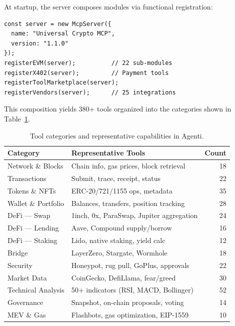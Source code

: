 \documentclass[11pt]{article}
\begin{document}
At startup, the server composes modules via functional registration:

\begin{lstlisting}[caption={Module composition at server initialization.},label={lst:compose}]
const server = new McpServer({
  name: "Universal Crypto MCP",
  version: "1.1.0"
});
registerEVM(server);          // 22 sub-modules
registerX402(server);         // Payment tools
registerToolMarketplace(server);
registerVendors(server);      // 25 integrations
\end{lstlisting}

This composition yields 380+ tools organized into the categories shown in Table~\ref{tab:tools}.

\begin{table}[t]
\centering
\caption{Tool categories and representative capabilities in Agenti.}
\label{tab:tools}
\begin{tabular}{@{}llr@{}}
\toprule
\textbf{Category} & \textbf{Representative Tools} & \textbf{Count} \\
\midrule
Network \& Blocks     & Chain info, gas prices, block retrieval       & 18 \\
Transactions          & Submit, trace, receipt, status                 & 22 \\
Tokens \& NFTs        & ERC-20/721/1155 ops, metadata                 & 35 \\
Wallet \& Portfolio   & Balances, transfers, position tracking         & 28 \\
DeFi --- Swap         & 1inch, 0x, ParaSwap, Jupiter aggregation      & 24 \\
DeFi --- Lending      & Aave, Compound supply/borrow                  & 16 \\
DeFi --- Staking      & Lido, native staking, yield calc              & 12 \\
Bridge                & LayerZero, Stargate, Wormhole                 & 18 \\
Security              & Honeypot, rug pull, GoPlus, approvals         & 22 \\
Market Data           & CoinGecko, DefiLlama, fear/greed              & 30 \\
Technical Analysis    & 50+ indicators (RSI, MACD, Bollinger)         & 52 \\
Governance            & Snapshot, on-chain proposals, voting           & 14 \\
MEV \& Gas            & Flashbots, gas optimization, EIP-1559         & 10 \\

\end{tabular}
\end{table}
\end{document}
